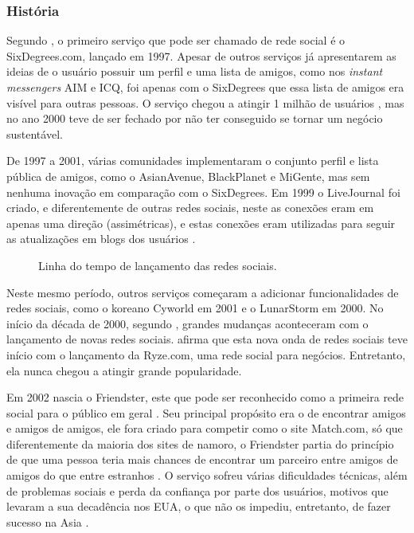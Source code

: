 \documentclass[diss]{template/setrem}
\begin{document}
\subsubsection{História}
Segundo \citet{Boyd2007}, o primeiro serviço que pode ser chamado de rede social é o SixDegrees.com, lançado em 1997. Apesar de outros serviços já apresentarem as ideias de o usuário possuir um perfil e uma lista de amigos, como nos \emph{instant messengers} AIM e ICQ, foi apenas com o SixDegrees que essa lista de amigos era visível para outras pessoas. O serviço chegou a atingir 1 milhão de usuários \citep{Mofo2011}, mas no ano 2000 teve de ser fechado por não ter conseguido se tornar um negócio sustentável.

De 1997 a 2001, várias comunidades implementaram o conjunto perfil e lista pública de amigos, como o AsianAvenue, BlackPlanet e MiGente, mas sem nenhuma inovação em comparação com o SixDegrees. Em 1999 o LiveJournal foi criado, e diferentemente de outras redes sociais, neste as conexões eram em apenas uma direção (assimétricas), e estas conexões eram utilizadas para seguir as atualizações em blogs dos usuários \citep{Chapman2009, Boyd2007}.

\begin{figure}
    \caption{Linha do tempo de lançamento das redes sociais.}
    \label{fig:social-network-timeline}
\end{figure}

Neste mesmo período, outros serviços começaram a adicionar funcionalidades de redes sociais, como o koreano Cyworld em 2001 e o LunarStorm em 2000. No início da década de 2000, segundo \citet{Chapman2009}, grandes mudanças aconteceram com o lançamento de novas redes sociais. \citet{Boyd2007} afirma que esta nova onda de redes sociais teve início com o lançamento da Ryze.com, uma rede social para negócios. Entretanto, ela nunca chegou a atingir grande popularidade.

Em 2002 nascia o Friendster, este que pode ser reconhecido como a primeira rede social para o público em geral \citep{Chapman2009}. Seu principal propósito era o de encontrar amigos e amigos de amigos, ele fora criado para competir como o site Match.com, só que diferentemente da maioria dos sites de namoro, o Friendster partia do princípio de que uma pessoa teria mais chances de encontrar um parceiro entre amigos de amigos do que entre estranhos \citep{Chapman2009, Boyd2007}. O serviço sofreu várias dificuldades técnicas, além de problemas sociais e perda da confiança por parte dos usuários, motivos que levaram a sua decadência nos EUA, o que não os impediu, entretanto, de fazer sucesso na Asia \citep{Boyd2007}.
\end{document}
